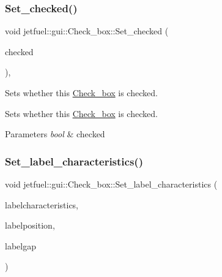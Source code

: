 \subsubsection{\texorpdfstring{Set\+\_\+checked()}{Set\_checked()}}
{\footnotesize\ttfamily void jetfuel\+::gui\+::\+Check\+\_\+box\+::\+Set\+\_\+checked (\begin{DoxyParamCaption}\item[{const bool}]{checked }\end{DoxyParamCaption})\hspace{0.3cm}{\ttfamily [inline]}, {\ttfamily [protected]}}



Sets whether this \hyperlink{classjetfuel_1_1gui_1_1Check__box}{Check\+\_\+box} is checked. 

Sets whether this \hyperlink{classjetfuel_1_1gui_1_1Check__box}{Check\+\_\+box} is checked.


\begin{DoxyParams}{Parameters}
{\em bool} & checked \\
\hline
\end{DoxyParams}
\mbox{\label{classjetfuel_1_1gui_1_1Check__box_aa7dbb21f37090d3a595d0111acc721b3}} 
\subsubsection{\texorpdfstring{Set\+\_\+label\+\_\+characteristics()}{Set\_label\_characteristics()}}
{\footnotesize\ttfamily void jetfuel\+::gui\+::\+Check\+\_\+box\+::\+Set\+\_\+label\+\_\+characteristics (\begin{DoxyParamCaption}\item[{\hyperlink{structjetfuel_1_1draw_1_1Text_1_1Text__characteristics}{jetfuel\+::draw\+::\+Text\+::\+Text\+\_\+characteristics}}]{labelcharacteristics,  }\item[{Label\+\_\+position}]{labelposition,  }\item[{unsigned int}]{labelgap }\end{DoxyParamCaption})\hspace{0.3cm}{\ttfamily [inline]}}



